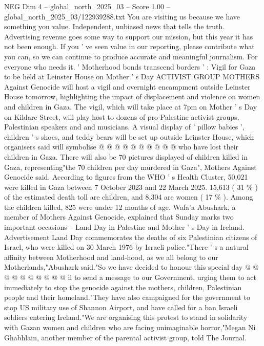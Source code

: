 \begin{textsample}{NEG Dim 4 – global\_north\_2025\_03 – Score 1.00 – global\_north\_2025\_03/122939288.txt}  \label{ex:f4_neg_399}
You are visiting us because we have something you value.
Independent, unbiased news that tells the truth.
Advertising revenue goes some way to support our mission, but this year it has not been enough.
If you ' ve seen value in our reporting, please contribute what you can, so we can continue to produce accurate and meaningful journalism.
For everyone who needs it. ' Motherhood bonds transcend borders ' : Vigil for Gaza to be held at Leinster House on Mother ' s Day ACTIVIST GROUP MOTHERS Against Genocide will host a vigil and overnight encampment outside Leinster House tomorrow, highlighting the impact of displacement and violence on women and children in Gaza.
The vigil, which will take place at 7pm on Mother ' s Day on Kildare Street, will play host to dozens of pro-Palestine activist groups, Palestinian speakers and and musicians.
A visual display of ' pillow babies ', children ' s shoes, and teddy bears will be set up outside Leinster House, which organisers said will symbolise @ @ @ @ @ @ @ @ @ @ who have lost their children in Gaza.
There will also be 70 pictures displayed of children killed in Gaza, representing"the 70 children per day murdered in Gaza", Mothers Against Genocide said.
According to figures from the WHO ' s Health Cluster, 50,021 were killed in Gaza between 7 October 2023 and 22 March 2025. 15,613 ( 31 \% ) of the estimated death toll are children, and 8,304 are women ( 17 \% ).
Among the children killed, 825 were under 12 months of age.
Wafa'a Abushark, a member of Mothers Against Genocide, explained that Sunday marks two important occasions -- Land Day in Palestine and Mother ' s Day in Ireland.
Advertisement Land Day commemorates the deaths of six Palestinian citizens of Israel, who were killed on 30 March 1976 by Israeli police."There ' s a natural affinity between Motherhood and land-hood, as we all belong to our Motherlands,"Abushark said."So we have decided to honour this special day @ @ @ @ @ @ @ @ @ @ il to send a message to our Government, urging them to act immediately to stop the genocide against the mothers, children, Palestinian people and their homeland."They have also campaigned for the government to stop US military use of Shannon Airport, and have called for a ban Israeli soldiers entering Ireland."We are organising this protest to stand in solidarity with Gazan women and children who are facing unimaginable horror,"Megan Ni Ghabhlain, another member of the parental activist group, told The Journal.

\end{textsample}
